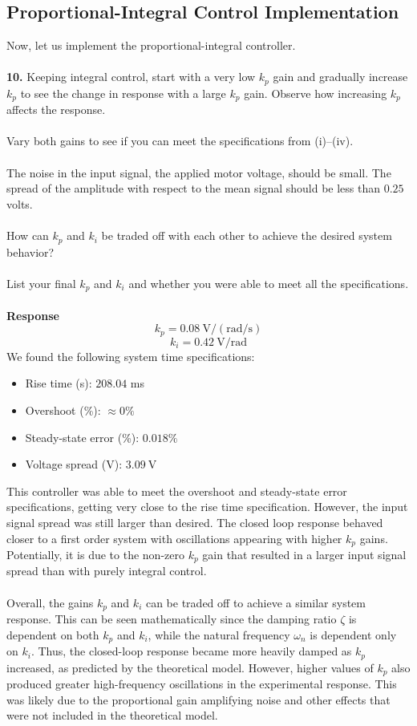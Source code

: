 ﻿\documentclass[12pt]{article}
\begin{document}
\subsection*{Proportional-Integral Control Implementation}
Now, let us implement the proportional-integral controller.\\\\
\textbf{10.} Keeping integral control, start with a very low $k_p$ gain and gradually increase $k_p$ to see the change in response with a large $k_p$ gain. Observe how increasing $k_p$ affects the response.\\\\
Vary both gains to see if you can meet the specifications from (i)--(iv).\\\\
The noise in the input signal, the applied motor voltage, should be small. The spread of the amplitude with respect to the mean signal should be less than $0.25$ volts.\\\\
How can $k_p$ and $k_i$ be traded off with each other to achieve the desired system behavior?\\\\
List your final $k_p$ and $k_i$ and whether you were able to meet all the specifications.\\\\
\textbf{Response}
\[
k_p = 0.08~\mathrm{V/(rad/s)}
\]
\[
k_i = 0.42~\mathrm{V/rad}
\]
We found the following system time specifications:
\begin{itemize}
    \item Rise time (s): $208.04$ ms
    \item Overshoot (\%): $\approx 0\%$
    \item Steady-state error (\%): $0.018\%$
    \item Voltage spread (V): $3.09~\mathrm{V}$
\end{itemize}
This controller was able to meet the overshoot and steady-state error specifications, getting very close to the rise time specification. However, the input signal spread was still larger than desired. The closed loop response behaved closer to a first order system with oscillations appearing with higher $k_p$ gains. Potentially, it is due to the non-zero $k_p$ gain that resulted in a larger input signal spread than with purely integral control.\\\\
Overall, the gains $k_p$ and $k_i$ can be traded off to achieve a similar system response. This can be seen mathematically since the damping ratio $\zeta$ is dependent on both $k_p$ and $k_i$, while the natural frequency $\omega_n$ is dependent only on $k_i$. Thus, the closed-loop response became more heavily damped as $k_p$ increased, as predicted by the theoretical model. However, higher values of $k_p$ also produced greater high-frequency oscillations in the experimental response. This was likely due to the proportional gain amplifying noise and other effects that were not included in the theoretical model.
\newpage
\end{document}
